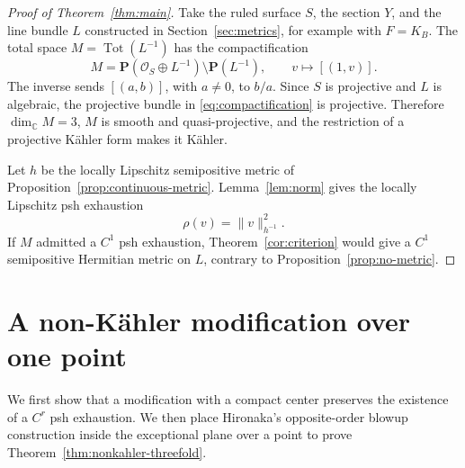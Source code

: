 \documentclass[11pt]{amsart}
\theoremstyle{definition}
\theoremstyle{remark}
\numberwithin{equation}{section}
\newcommand{\C}{\mathbb C}
\newcommand{\PP}{\mathbf P}
\newcommand{\OO}{\mathcal O}
\newcommand{\Tot}{\operatorname{Tot}}
\begin{document}
\begin{proof}[Proof of Theorem~\ref{thm:main}]\label{sec:conclusion}
Take the ruled surface $S$, the section $Y$, and the line bundle $L$
constructed in Section~\ref{sec:metrics}, for example with $F=K_B$.
The total space $M=\Tot(L^{-1})$ has the compactification
\begin{equation}\label{eq:compactification}
 M=\PP(\OO_S\oplus L^{-1})
 \setminus\PP(L^{-1}),\qquad
 v\longmapsto[(1,v)].
\end{equation}
The inverse sends $[(a,b)]$, with $a\ne0$, to $b/a$.
Since $S$ is projective and $L$ is algebraic, the projective bundle
in \eqref{eq:compactification} is projective. Therefore
$\dim_\C M=3$, $M$ is smooth and quasi-projective, and the
restriction of a projective K\"ahler form makes it K\"ahler.

Let $h$ be the locally Lipschitz semipositive metric of
Proposition~\ref{prop:continuous-metric}. Lemma~\ref{lem:norm}
gives the locally Lipschitz psh exhaustion
\begin{equation}\label{eq:explicit-exhaustion}
 \rho(v)=\|v\|_{h^{-1}}^2.
\end{equation}
If $M$ admitted a $C^1$ psh exhaustion,
Theorem~\ref{cor:criterion} would give a $C^1$ semipositive
Hermitian metric on $L$, contrary to Proposition~\ref{prop:no-metric}.
\end{proof}

\section{A non-K\"ahler modification over one point}\label{sec:nonkahler}

We first show that a modification with a compact center preserves
the existence of a $C^r$ psh exhaustion. We then place Hironaka's
opposite-order blowup construction inside the exceptional plane over
a point to prove Theorem~\ref{thm:nonkahler-threefold}.
\end{document}
